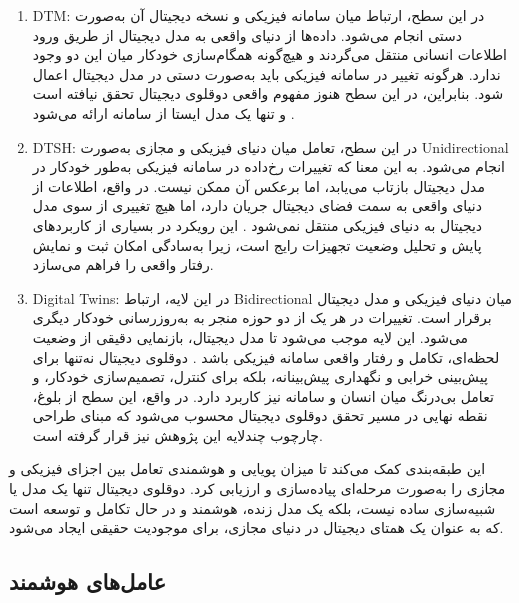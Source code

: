 \begin{enumerate}
\item 
\gls{DTM}:
در این سطح، ارتباط میان سامانه فیزیکی و نسخه دیجیتال آن به‌صورت دستی انجام می‌شود. داده‌ها از دنیای واقعی به مدل دیجیتال از طریق ورود اطلاعات انسانی منتقل می‌گردند و هیچ‌گونه همگام‌سازی خودکار میان این دو وجود ندارد. هرگونه تغییر در سامانه فیزیکی باید به‌صورت دستی در مدل دیجیتال اعمال شود. بنابراین، در این سطح هنوز مفهوم واقعی دوقلوی دیجیتال تحقق نیافته است و تنها یک مدل ایستا از سامانه ارائه می‌شود \cite{tao2019digital}.

\item 
\gls{DTSH}:
در این سطح، تعامل میان دنیای فیزیکی و مجازی به‌صورت \gls{Unidirectional} انجام می‌شود. به این معنا که تغییرات رخ‌داده در سامانه فیزیکی به‌طور خودکار در مدل دیجیتال بازتاب می‌یابد، اما برعکس آن ممکن نیست. در واقع، اطلاعات از دنیای واقعی به سمت فضای دیجیتال جریان دارد، اما هیچ تغییری از سوی مدل دیجیتال به دنیای فیزیکی منتقل نمی‌شود \cite{qi2021enabling,barricelli2019survey}.  
این رویکرد در بسیاری از کاربردهای پایش و تحلیل وضعیت تجهیزات رایج است، زیرا به‌سادگی امکان ثبت و نمایش رفتار واقعی را فراهم می‌سازد.

\item 
\gls{Digital Twins}:
در این لایه، ارتباط \gls{Bidirectional} میان دنیای فیزیکی و مدل دیجیتال برقرار است. تغییرات در هر یک از دو حوزه منجر به به‌روزرسانی خودکار دیگری می‌شود. این لایه موجب می‌شود تا مدل دیجیتال، بازنمایی دقیقی از وضعیت لحظه‌ای، تکامل و رفتار واقعی سامانه فیزیکی باشد \cite{tao2018digital,fuller2020digital,wang2024comprehensive}.  
دوقلوی دیجیتال نه‌تنها برای پیش‌بینی خرابی و نگهداری پیش‌بینانه، بلکه برای کنترل، تصمیم‌سازی خودکار، و تعامل بی‌درنگ میان انسان و سامانه نیز کاربرد دارد. در واقع، این سطح از بلوغ، نقطه نهایی در مسیر تحقق دوقلوی دیجیتال محسوب می‌شود که مبنای طراحی چارچوب چندلایه این پژوهش نیز قرار گرفته است.
\end{enumerate}

 
این طبقه‌بندی کمک می‌کند تا میزان پویایی و هوشمندی تعامل بین اجزای فیزیکی و مجازی را به‌صورت مرحله‌ای پیاده‌سازی و ارزیابی کرد. دوقلوی دیجیتال تنها یک مدل یا شبیه‌سازی ساده نیست، بلکه یک مدل زنده،‌ هوشمند و در حال تکامل و توسعه است که به عنوان یک همتای دیجیتال در دنیای مجازی، برای موجودیت حقیقی ایجاد می‌شود.




\subsection{عامل‌های هوشمند}

